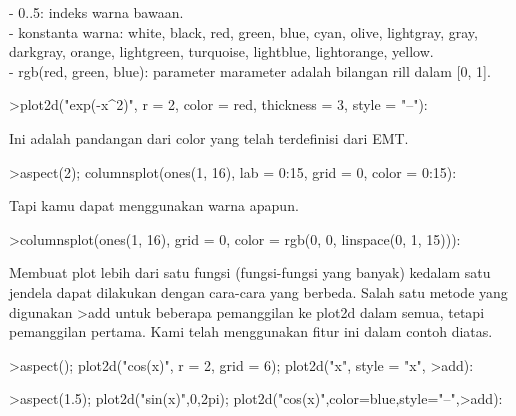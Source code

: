 \documentclass[a4paper,10pt]{article}
\begin{document}
\begin{eulernotebook}
\begin{eulercomment}
\begin{eulercomment}
\begin{eulercomment}
\begin{eulercomment}
\begin{eulercomment}
- 0..5: indeks warna bawaan.\\
- konstanta warna: white, black, red, green, blue, cyan, olive, lightgray, gray, darkgray, orange, lightgreen,
turquoise, lightblue, lightorange, yellow.\\
- rgb(red, green, blue): parameter marameter adalah bilangan rill dalam [0, 1].
\end{eulercomment}
\begin{eulerprompt}
>plot2d("exp(-x^2)", r = 2, color = red, thickness = 3, style = "--"):
\end{eulerprompt}
\begin{eulercomment}
Ini adalah pandangan dari color yang telah terdefinisi dari EMT.
\end{eulercomment}
\begin{eulerprompt}
>aspect(2); columnsplot(ones(1, 16), lab = 0:15, grid = 0, color = 0:15):
\end{eulerprompt}
\begin{eulercomment}
Tapi kamu dapat menggunakan warna apapun.
\end{eulercomment}
\begin{eulerprompt}
>columnsplot(ones(1, 16), grid = 0, color = rgb(0, 0, linspace(0, 1, 15))):
\end{eulerprompt}
\begin{eulercomment}
Membuat plot lebih dari satu fungsi (fungsi-fungsi yang banyak) kedalam satu jendela dapat dilakukan dengan
cara-cara yang berbeda. Salah satu metode yang digunakan \textgreater{}add untuk beberapa pemanggilan ke plot2d dalam semua,
tetapi pemanggilan pertama. Kami telah menggunakan fitur ini dalam contoh diatas.
\end{eulercomment}
\begin{eulerprompt}
>aspect(); plot2d("cos(x)", r = 2, grid = 6); plot2d("x", style = "x", >add):
\end{eulerprompt}
\begin{eulerprompt}
>aspect(1.5); plot2d("sin(x)",0,2pi); plot2d("cos(x)",color=blue,style="--",>add):
\end{eulerprompt}
\begin{eulercomment}

\end{eulercomment}
\end{eulercomment}
\end{eulercomment}
\end{eulercomment}
\end{eulercomment}
\end{eulernotebook}
\end{document}
